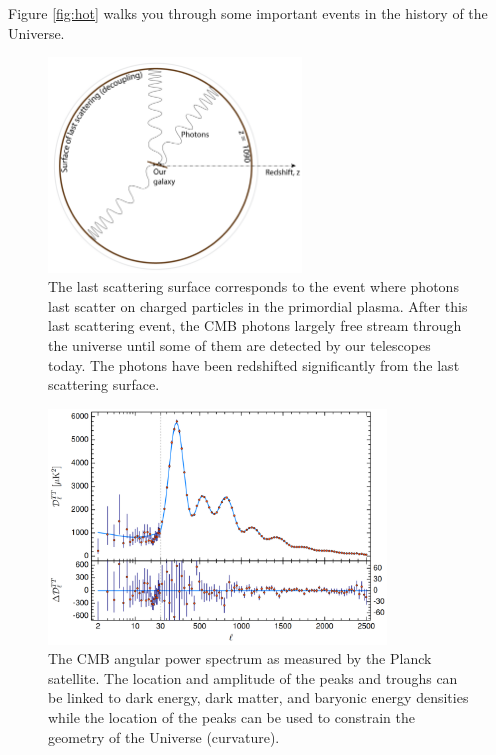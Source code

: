 \documentclass[a4paper,12pt]{article}
\theoremstyle{remark}
\renewcommand{\=}[1]{\stackrel{#1}{=}} %
\theoremstyle{plain}
\theoremstyle{definition}
\begin{document}
Figure \ref{fig:hot} walks you through some important events in the history of the Universe.


\begin{figure}[t]
\begin{center}
    \includegraphics*[angle=0,width=0.6\textwidth]{img/last_scattering_surface.png}
    \caption[Last scattering surface]{The last scattering surface corresponds to the event where photons last scatter on charged particles in the primordial plasma. After this last scattering event, the CMB photons largely free stream through the universe until some of them are detected by our telescopes today. The photons have been redshifted significantly from the last scattering surface.}
\label{fig:lssurface}
\end{center}
\end{figure}

\begin{figure}[t]
\begin{center}
    \includegraphics*[angle=0,width=0.8\textwidth]{img/planck_tt.png}
    \caption[The CMB power spectrum]{The CMB angular power spectrum as measured by the Planck satellite. The location and amplitude of the peaks and troughs can be linked to dark energy, dark matter, and baryonic energy densities while the location of the peaks can be used to constrain the geometry of the Universe (curvature).}
\label{fig:tt_spectra}
\end{center}
\end{figure}
\end{document}

